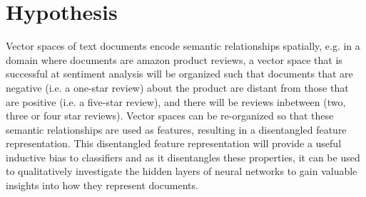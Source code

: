 







\section{Hypothesis}


Vector spaces of text documents encode semantic relationships spatially, e.g. in a domain where documents are amazon product reviews, a vector space that is successful at sentiment analysis will be organized such that documents that are negative (i.e. a one-star review) about the product are distant from those that are positive (i.e. a five-star review), and there will be reviews inbetween (two, three or four star reviews). Vector spaces can be re-organized so that these semantic relationships are used as features, resulting in a disentangled feature representation. This disentangled feature representation will provide a useful inductive bias to classifiers and as it disentangles these properties, it can be used to qualitatively investigate the hidden layers of neural networks to gain valuable insights into how they represent documents. 

